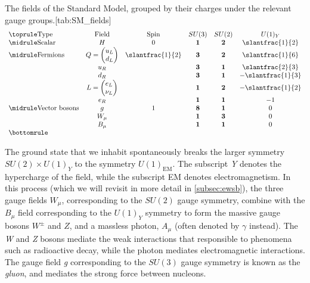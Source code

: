 \begin{table}
  \begin{sidecaption}{The fields of the Standard Model, grouped by their charges under the relevant gauge groups.}[tab:SM_fields]
  \[
  \begin{array}{lccccc}
    \toprule
   \text{Type}                & \text{Field}              & \text{Spin}      & SU(3)      & SU(2)      & U(1)_Y \\\midrule
   \text{Scalar}              & H                         & 0                & \mathbf{1} & \mathbf{2} & \slantfrac{1}{2}\\\midrule
   \text{Fermions}            & Q = \vdoublet{u_L}{d_L}   & \slantfrac{1}{2} & \mathbf{3} & \mathbf{2} & \slantfrac{1}{6}\\
                              & u_R                       &                  & \mathbf{3} & \mathbf{1} & \slantfrac{2}{3}\\
                              & d_R                       &                  & \mathbf{3} & \mathbf{1} & -\slantfrac{1}{3}\\
                              & L = \vdoublet{e_L}{\nu_L} &                  & \mathbf{1} & \mathbf{2} & -\slantfrac{1}{2}\\
                              & e_R                       &                  & \mathbf{1} & \mathbf{1} & -1\\\midrule
    \text{Vector bosons}      & g                         & 1                & \mathbf{8} & \mathbf{1} & 0 \\
                              & W_\mu                     &                  & \mathbf{1} & \mathbf{3} & 0 \\
                              & B_\mu                     &                  & \mathbf{1} & \mathbf{1} & 0\\
    \bottomrule
  \end{array}
\]
\end{sidecaption}
\end{table}

The ground state that we inhabit spontaneously breaks the larger symmetry $SU(2)\times U(1)_Y$ to the symmetry $U(1)_\text{EM}$. The subscript \emph{Y} denotes the hypercharge of the field, while the subscript EM denotes electromagnetism. In this process (which we will revisit in more detail in \autoref{subsec:ewsb}), the three gauge fields $W_\mu$, corresponding to the $SU(2)$ gauge symmetry, combine with the $B_\mu$ field corresponding to the $U(1)_Y$ symmetry to form the massive gauge bosons $W^\pm$ and $Z$, and a massless photon, $A_\mu$ (often denoted by $\gamma$ instead). The \emph{W} and \emph{Z} bosons mediate the weak interactions that responsible to phenomena such as radioactive decay, while the photon mediates electromagnetic interactions. The gauge field \emph{g} corresponding to the $SU(3)$ gauge symmetry is known as the \emph{gluon}, and mediates the strong force between nucleons. 


